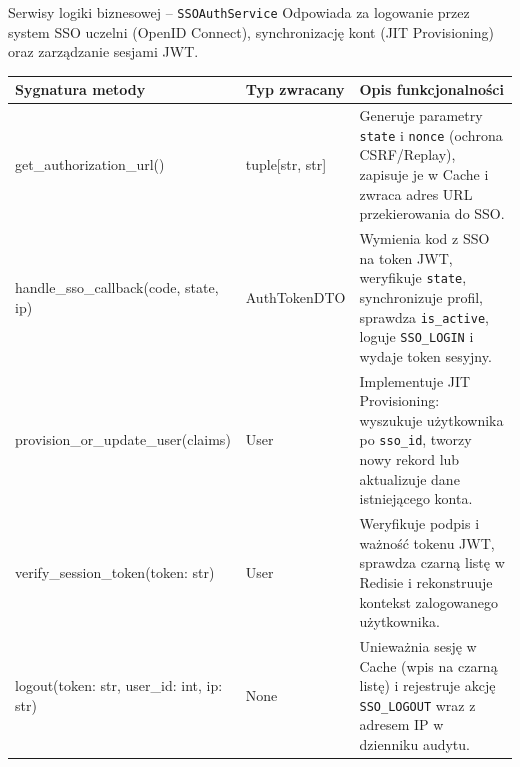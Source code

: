 \documentclass[aspectratio=169, 10pt, xcolor=table]{beamer}
\renewcommand{\arraystretch}{1.18}
\begin{document}
\begin{frame}{Serwisy logiki biznesowej -- \texttt{SSOAuthService}}
    \scriptsize
    \renewcommand{\arraystretch}{1.15}
    Odpowiada za logowanie przez system SSO uczelni (OpenID Connect), synchronizację kont (JIT Provisioning) oraz zarządzanie sesjami JWT.
    \vspace{3pt}

    \begin{tabularx}{\textwidth}{@{} M{0.35\textwidth} T{0.15\textwidth} Y @{}}
        \toprule
        \textbf{\textsf{\textcolor{NavyPrimary}{Sygnatura metody}}} & \textbf{\textsf{\textcolor{NavyPrimary}{Typ zwracany}}} & \textbf{\textcolor{NavyPrimary}{Opis funkcjonalności}} \\
        \midrule
        get\_authorization\_url() & tuple[str, str] & Generuje parametry \texttt{state} i \texttt{nonce} (ochrona CSRF/Replay), zapisuje je w Cache i zwraca adres URL przekierowania do SSO. \\
        handle\_sso\_callback(code, state, ip) & AuthTokenDTO & Wymienia kod z SSO na token JWT, weryfikuje \texttt{state}, synchronizuje profil, sprawdza \texttt{is\_active}, loguje \texttt{SSO\_LOGIN} i wydaje token sesyjny. \\
        provision\_or\_update\_user(claims) & User & Implementuje JIT Provisioning: wyszukuje użytkownika po \texttt{sso\_id}, tworzy nowy rekord lub aktualizuje dane istniejącego konta. \\
        verify\_session\_token(token: str) & User & Weryfikuje podpis i ważność tokenu JWT, sprawdza czarną listę w Redisie i rekonstruuje kontekst zalogowanego użytkownika. \\
        logout(token: str, user\_id: int, ip: str) & None & Unieważnia sesję w Cache (wpis na czarną listę) i rejestruje akcję \texttt{SSO\_LOGOUT} wraz z adresem IP w dzienniku audytu. \\
        \bottomrule
    \end{tabularx}
\end{frame}
\end{document}
